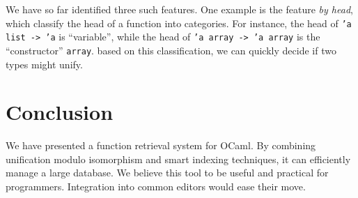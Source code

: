 \documentclass [a4paper,11pt]{scrartcl}
\begin{document}
\medskip
We have so far identified three such features. One example is the feature
\emph{by head}, which classify the head of a function into categories.
For instance, the head of \texttt{'a list -> 'a} is ``variable'',
while the head of \texttt{'a array -> 'a array} is the ``constructor''
\texttt{array}.
based on this classification, we can quickly
decide if two types might unify.





\section{Conclusion}

We have presented a function retrieval system for OCaml. By combining unification modulo isomorphism and smart indexing techniques, it can efficiently manage a large database. We believe this tool to be useful and practical for programmers. Integration into common editors would ease their move.


\printbibliography
\end{document}
